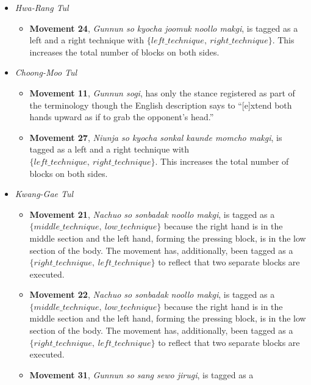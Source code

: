 \documentclass[10pt,twocolumn,a4paper]{article}
\begin{document}
\begin{itemize}
  \item
    \emph{Hwa-Rang Tul}
    \begin{itemize}
      \item
        {\bf Movement 24}, \emph{Gunnun so kyocha joomuk noollo makgi}, is
        tagged as a left and a right technique with $\{left\_technique, \:
        right\_technique\}$. This increases the total number of blocks on both
        sides.
    \end{itemize}
  \item
    \emph{Choong-Moo Tul}
    \begin{itemize}
      \item
        {\bf Movement 11}, \emph{Gunnun sogi}, has only the stance registered
        as part of the terminology though the English description says to
        ``[e]xtend both hands upward as if to grab the opponent's head.''
      \item
        {\bf Movement 27}, \emph{Niunja so kyocha sonkal kaunde momcho makgi},
        is tagged as a left and a right technique with $\{left\_technique, \:
        right\_technique\}$. This increases the total number of blocks on both
        sides.
    \end{itemize}
  \item
    \emph{Kwang-Gae Tul}
    \begin{itemize}
      \item
        {\bf Movement 21}, \emph{Nachuo so sonbadak noollo makgi}, is tagged as
        a $\{middle\_technique, \: low\_technique\}$ because the right hand is
        in the middle section and the left hand, forming the pressing block, is
        in the low section of the body. The movement has, additionally, been
        tagged as a $\{right\_technique, \: left\_technique\}$ to reflect that
        two separate blocks are executed.
      \item
        {\bf Movement 22}, \emph{Nachuo so sonbadak noollo makgi}, is tagged as
        a $\{middle\_technique, \: low\_technique\}$ because the right hand is
        in the middle section and the left hand, forming the pressing block, is
        in the low section of the body. The movement has, additionally, been
        tagged as a $\{right\_technique, \: left\_technique\}$ to reflect that
        two separate blocks are executed.
      \item
        {\bf Movement 31}, \emph{Gunnun so sang sewo jirugi}, is tagged as a

\end{itemize}
\end{itemize}
\end{document}
